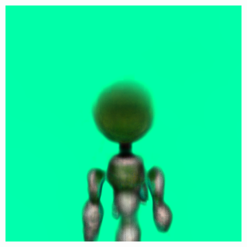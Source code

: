 \begin{figure}[ht]
\begin{subfigure}[b]{0.20\textwidth}
        \includegraphics[width=\textwidth]{etc/a robot made out of plants/dreamfusion2/dreamfusion_plantrobot_10000_part1.png}
        \caption{}
    \end{subfigure}
    \hspace{.5cm}
    \begin{subfigure}[b]{0.252\textwidth}
        \centering

\end{subfigure}
\end{figure}
